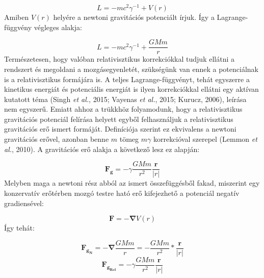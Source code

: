\begin{multicols}{2}
\begin{equation} \label{eq:12}
    L
    =
    - mc^{2} \gamma^{-1} + V(r)
\end{equation}
Amiben $V \left( r \right)$ helyére a newtoni gravitációs potenciált írjuk. Így a Lagrange-függvény végleges alakja:

\begin{equation} \label{eq:13}
    L
    =
    - mc^{2} \gamma^{-1} + \frac{GMm}{r}
\end{equation}
Természetesen, hogy valóban relativisztikus korrekciókkal tudjuk ellátni a rendszert és megoldani a mozgásegyenletét, szükségünk van ennek a potenciálnak is a relativisztikus formájára is. A teljes Lagrange-függvényt, tehát egyszerre a kinetikus energiát és potenciális energiát is ilyen korrekciókkal ellátni egy aktívan kutatott téma (Singh \emph{et al.}, 2015\cite{2015CaJPh..93..549S}; Vayenas \emph{et al.}, 2015\cite{vayenas2015gravitational}; Kurucz, 2006\cite{kurucz2006precession}), leírása nem egyszerű. Emiatt ahhoz a trükkhöz folyamodunk, hogy a relativisztikus gravitációs potenciál felírása helyett egyből felhasználjuk a relativisztikus gravitációs erő ismert formáját. Definíciója szerint ez ekvivalens a newtoni gravitációs erővel, azonban benne $m$ tömeg $m \gamma$ korrekcióval szerepel (Lemmon \emph{et al.}, 2010\cite{2010arXiv1012.5438L}). A gravitációs erő alakja a következő lesz ez alapján:

\begin{equation} \label{eq:14}
    \boldsymbol{F_{g}} = - \gamma \frac{GMm}{r^{2}} \frac{\boldsymbol{r}}{\left| r \right|} 
\end{equation}
Melyben maga a newtoni rész abból az ismert összefüggésből fakad, miszerint egy konzervatív erőtérben mozgó testre ható erő kifejezhető a potenciál negatív gradiensével:

\begin{equation} \label{eq:15}
    \boldsymbol{F}
    =
    - \boldsymbol{\nabla} V \left( r \right)
\end{equation}
Így tehát:

\begin{equation} \label{eq:16}
    \boldsymbol{F_{g_{N}}}
    =
    - \boldsymbol{\nabla} \frac{GMm}{r}
    =
    - \frac{GMm}{r^{2}} * \frac{\boldsymbol{r}}{\left| r \right|}
\end{equation}
\begin{equation} \label{eq:17}
    \boldsymbol{F_{g_{Rel}}}
    =
    - \gamma \frac{GMm}{r^{2}} \frac{\boldsymbol{r}}{\left| r \right|} 
\end{equation}


\end{multicols}
